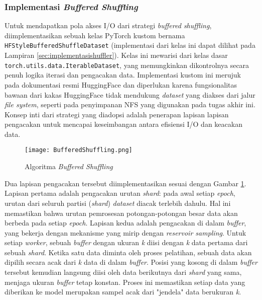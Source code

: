 \subsubsection{Implementasi \textit{Buffered Shuffling}}
\begin{sloppypar}
Untuk mendapatkan pola akses I/O dari strategi \textit{buffered shuffling}, diimplementasikan sebuah kelas PyTorch kustom bernama \texttt{HFStyleBufferedShuffleDataset} (implementasi dari kelas ini dapat dilihat pada Lampiran \ref{sec:implementasishuffler}). Kelas ini mewarisi dari kelas dasar \texttt{torch.utils.data.IterableDataset}, yang memungkinkan dikontrolnya secara penuh logika iterasi dan pengacakan data. Implementasi kustom ini merujuk pada dokumentasi resmi HuggingFace \parencite{HuggingFaceIterableDataset} dan diperlukan karena fungsionalitas bawaan dari kakas HuggingFace tidak mendukung \textit{dataset} yang diakses dari jalur \textit{file system}, seperti pada penyimpanan NFS yang digunakan pada tugas akhir ini. Konsep inti dari strategi yang diadopsi adalah penerapan lapisan lapisan pengacakan untuk mencapai keseimbangan antara efisiensi I/O dan keacakan data.
\end{sloppypar}

\begin{figure}[t]
    \centering
    \texttt{[image: BufferedShuffling.png]}
    \caption{Algoritma \textit{Buffered Shuffling}}
    \label{fig:BufferedShuffling}
\end{figure}

Dua lapisan pengacakan tersebut diimplementasikan sesuai dengan Gambar \ref{fig:BufferedShuffling}. Lapisan pertama adalah pengacakan urutan \textit{shard}: pada awal setiap \textit{epoch}, urutan dari seluruh partisi (\textit{shard}) \textit{dataset} diacak terlebih dahulu. Hal ini memastikan bahwa urutan pemrosesan potongan-potongan besar data akan berbeda pada setiap \textit{epoch}. Lapisan kedua adalah pengacakan di dalam \textit{buffer}, yang bekerja dengan mekanisme yang mirip dengan \textit{reservoir sampling}. Untuk setiap \textit{worker}, sebuah \textit{buffer} dengan ukuran \textit{k} diisi dengan \textit{k} data pertama dari sebuah \textit{shard}. Ketika satu data diminta oleh proses pelatihan, sebuah data akan dipilih secara acak dari \textit{k} data di dalam \textit{buffer}. Posisi yang kosong di dalam \textit{buffer} tersebut kemudian langsung diisi oleh data berikutnya dari \textit{shard} yang sama, menjaga ukuran \textit{buffer} tetap konstan. Proses ini memastikan setiap data yang diberikan ke model merupakan sampel acak dari "jendela" data berukuran \textit{k}.

